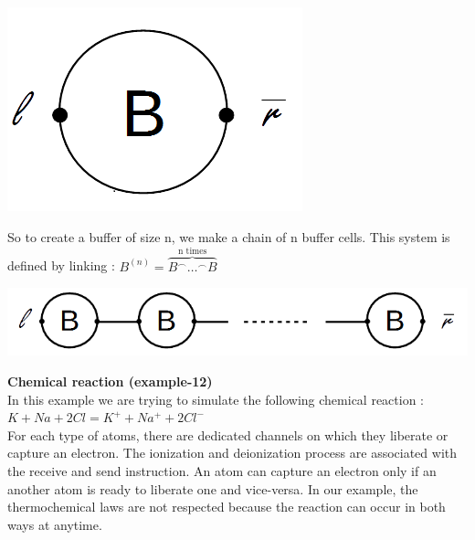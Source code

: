 \documentclass[11pt]{report}
\begin{document}
\begin{center}
\includegraphics[scale = 0.25]{BufferCell.png}
\end{center}
So to create a buffer of size n, we make a chain of n buffer cells. This system is defined by linking :
$B^{(n)} = \overbrace{B^{ \frown} \ldots ^{\frown} B}^{\text{n times}}$

\begin{center}
\includegraphics[scale = 0.4]{Buffern.png}
\end{center}

\newpage

\tabto{0cm} {\Large \textbf{Chemical reaction (example-12)}}
\vspace*{3pt}
\\
In this example we are trying to simulate the following chemical reaction : \\
$K + Na + 2Cl = K^+ + Na^+ + 2Cl^-$ \\
For each type of atoms, there are dedicated channels on which they liberate or capture an electron. The ionization and deionization process are associated with the receive and send instruction. An atom can capture an electron only if an another atom is ready to liberate one and vice-versa. In our example, the thermochemical laws are not respected because the reaction can occur in both ways at anytime.  
\end{document}
